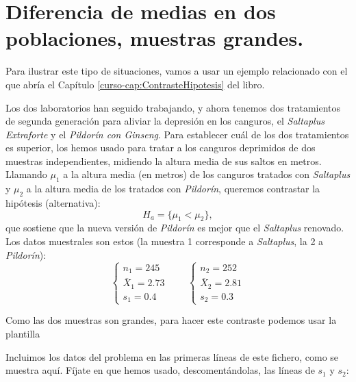 \documentclass[10pt,a4paper]{article}\usepackage[]{graphicx}\usepackage[]{color}
\newcounter {cont01}
\begin{document}
\section{Diferencia de medias en dos poblaciones, muestras grandes.}

Para ilustrar este tipo de situaciones, vamos a usar un ejemplo relacionado con el que abría el Capítulo \ref{curso-cap:ContrasteHipotesis} del libro.

Los dos laboratorios han seguido trabajando, y ahora tenemos dos tratamientos de segunda generación para aliviar la depresión en los canguros, el {\em Saltaplus Extraforte} y el {\em Pildorín con Ginseng}. Para establecer cuál de los dos tratamientos es superior, los hemos usado para tratar a los canguros deprimidos de dos muestras independientes, midiendo la altura media de sus saltos en metros. Llamando $\mu_1$ a la altura media (en metros) de los canguros tratados con {\em Saltaplus} y $\mu_2$ a la altura media de los tratados con {\em Pildorín}, queremos contrastar la hipótesis (alternativa):
\[H_a = \{\mu_1 < \mu_2\},\]
que sostiene que la nueva versión de {\em Pildorín} es mejor que el {\em Saltaplus} renovado. Los datos muestrales son estos (la muestra 1 corresponde a {\em Saltaplus}, la 2 a {\em Pildorín}):
\[
\begin{cases}
n_1 = 245\\
\bar X_1 = 2.73\\
s_1 = 0.4
\end{cases}
\qquad
\begin{cases}
n_2 = 252\\
\bar X_2 = 2.81\\
s_2 = 0.3
\end{cases}
\]

Como las dos muestras son grandes, para hacer este contraste podemos usar la plantilla
\begin{center}
\end{center}
Incluimos los datos del problema en las primeras líneas de este fichero, como se muestra aquí. Fíjate en que hemos usado, descomentándolas, las líneas de $s_1$ y $s_2$:
\end{document}
